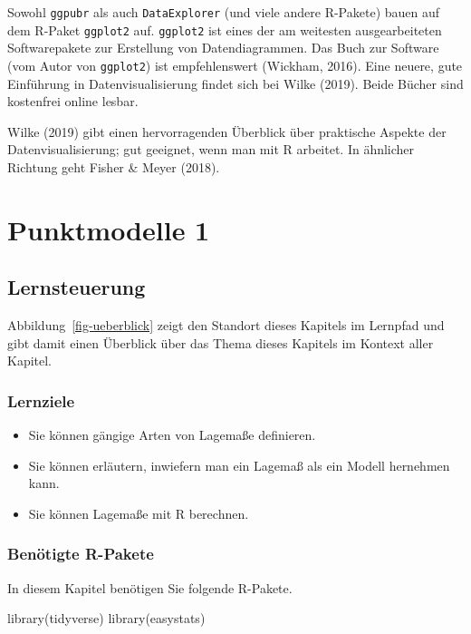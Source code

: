 \documentclass[
  letterpaper,
]{scrbook}
\newenvironment{Shaded}{\begin{snugshade}}{\end{snugshade}}
\newcommand{\FunctionTok}[1]{\textcolor[rgb]{0.28,0.35,0.67}{#1}}
\newcommand{\NormalTok}[1]{\textcolor[rgb]{0.00,0.23,0.31}{#1}}
\providecommand{\tightlist}{%
  \setlength{\itemsep}{0pt}\setlength{\parskip}{0pt}}\usepackage{longtable,booktabs,array}
\theoremstyle{definition}
\theoremstyle{definition}
\theoremstyle{definition}
\theoremstyle{remark}
\begin{document}
Sowohl \texttt{ggpubr} als auch \texttt{DataExplorer} (und viele andere
R-Pakete) bauen auf dem R-Paket \texttt{ggplot2} auf. \texttt{ggplot2}
ist eines der am weitesten ausgearbeiteten Softwarepakete zur Erstellung
von Datendiagrammen. Das Buch zur Software (vom Autor von
\texttt{ggplot2}) ist empfehlenswert (Wickham, 2016). Eine neuere, gute
Einführung in Datenvisualisierung findet sich bei Wilke (2019). Beide
Bücher sind kostenfrei online lesbar.

Wilke (2019) gibt einen hervorragenden Überblick über praktische Aspekte
der Datenvisualisierung; gut geeignet, wenn man mit R arbeitet. In
ähnlicher Richtung geht Fisher \& Meyer (2018).

\chapter{Punktmodelle 1}\label{sec-punktmodelle1}

\section{Lernsteuerung}\label{lernsteuerung-4}

Abbildung~\ref{fig-ueberblick} zeigt den Standort dieses Kapitels im
Lernpfad und gibt damit einen Überblick über das Thema dieses Kapitels
im Kontext aller Kapitel.

\subsection{Lernziele}\label{lernziele-5}

\begin{itemize}
\tightlist
\item
  Sie können gängige Arten von Lagemaße definieren.
\item
  Sie können erläutern, inwiefern man ein Lagemaß als ein Modell
  hernehmen kann.
\item
  Sie können Lagemaße mit R berechnen.
\end{itemize}

\subsection{Benötigte R-Pakete}\label{benuxf6tigte-r-pakete-2}

In diesem Kapitel benötigen Sie folgende R-Pakete.

\begin{Shaded}
\begin{Highlighting}[]
\FunctionTok{library}\NormalTok{(tidyverse)}
\FunctionTok{library}\NormalTok{(easystats)}
\end{Highlighting}
\end{Shaded}
\end{document}
